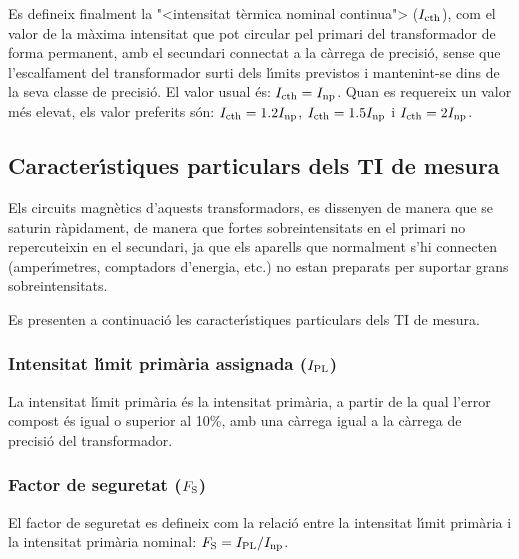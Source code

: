 Es defineix finalment la {"<}intensitat t\`{e}rmica nominal continua{">} ($I_\mathrm{cth}$), com
el valor de la m\`{a}xima intensitat que pot circular pel primari del
transformador  de forma permanent, amb el secundari connectat a la
c\`{a}rrega de precisi\'{o}, sense que l'escalfament del transformador surti
dels l\'{\i}mits previstos i mantenint-se dins de la
seva classe de precisi\'{o}. El valor usual \'{e}s: $I_\mathrm{cth} = I_\mathrm{np}$. Quan es requereix un valor m\'{e}s elevat, els valor preferits s\'{o}n:
$I_\mathrm{cth} = \num{1,2}I_\mathrm{np}$, $I_\mathrm{cth} = \num{1,5}I_\mathrm{np}$ i $I_\mathrm{cth} = 2 I_\mathrm{np}$.

\subsection{Caracter\'{\i}stiques particulars dels TI de mesura}

Els circuits magn\`{e}tics d'aquests transformadors, es dissenyen de
manera que se saturin r\`{a}pidament, de manera que fortes
sobreintensitats en el primari  no repercuteixin en el secundari,
ja que els aparells que normalment s'hi connecten (amper\'{\i}metres,
comptadors d'energia, etc.) no estan preparats per suportar grans
sobreintensitats.

Es presenten a continuaci\'{o} les caracter\'{\i}stiques particulars dels TI
de mesura.

\subsubsection{Intensitat l\'{\i}mit prim\`{a}ria  assignada ($I_\mathrm{PL}$)}

 La intensitat l\'{\i}mit prim\`{a}ria
\'{e}s la intensitat prim\`{a}ria, a partir de la qual l'error compost \'{e}s igual
o superior al 10\unit{\%}, amb una c\`{a}rrega igual a la c\`{a}rrega de
precisi\'{o} del transformador.

\subsubsection{Factor de seguretat ($F_\mathrm{S}$) }

 El factor de seguretat
es defineix com la relaci\'{o} entre la intensitat l\'{\i}mit prim\`{a}ria
i la intensitat prim\`{a}ria nominal: $F_\mathrm{S} = I_\mathrm{PL} / I_\mathrm{np}$.

